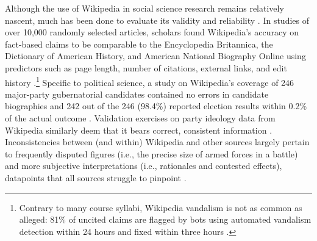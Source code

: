 \documentclass[fleqn,12pt]{article}
\begin{document}
Although the use of Wikipedia in social science research remains relatively nascent, much has been done to evaluate its validity and reliability \citep{greenstein_wikipediabiased_2012}. In studies of over 10,000 randomly selected articles, scholars found Wikipedia’s accuracy on fact-based claims to be comparable to the Encyclopedia Britannica, the Dictionary of American History, and American National Biography Online using predictors such as page length, number of citations, external links, and edit history \citep{rector_comparisonwikipediaother_2008}.\footnote{Contrary to many course syllabi, Wikipedia vandalism is not as common as alleged: 81\% of uncited claims are flagged by bots using automated vandalism detection within 24 hours and fixed within three hours \citep{tramullas_researchwikipediavandalism_2016}.} Specific to political science, a study on Wikipedia’s coverage of 246 major-party gubernatorial candidates contained no errors in candidate biographies and 242 out of the 246 (98.4\%) reported election results within 0.2\% of the actual outcome \citep{brown_wikipediadatasource_2011}. Validation exercises on party ideology data from Wikipedia similarly deem that it bears correct, consistent information \citep{herrmann_partypositionswikipedia_2023}. Inconsistencies between (and within) Wikipedia and other sources largely pertain to frequently disputed figures (i.e., the precise size of armed forces in a battle) and more subjective interpretations (i.e., rationales and contested effects), datapoints that all sources struggle to pinpoint \citep{oswald_clickclickboom_2022}.
\end{document}
